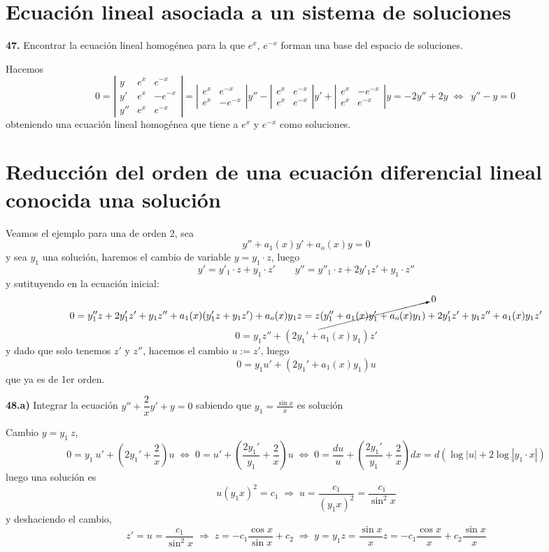\section{Ecuación lineal asociada a un sistema de soluciones}
\begin{ejer}
    \textbf{47.} Encontrar la ecuación lineal homogénea para la que $e^x$, $e^{-x}$ forman una base del espacio de soluciones.
\end{ejer}
\begin{sol}
    Hacemos
    $$0=\left|\begin{array}{ccc}
         y &  e^x & e^{-x}\\
         y' &  e^x & -e^{-x} \\
         y'' & e^x & e^{-x}
    \end{array}\right|=\left| \begin{array}{cc}
        e^x & e^{-x} \\
         e^x & -e^{-x} 
    \end{array}\right|y''-\left| \begin{array}{cc}
        e^x & e^{-x} \\
         e^x & e^{-x} 
    \end{array}\right|y'+\left| \begin{array}{cc}
        e^x & -e^{-x} \\
         e^x & e^{-x} 
    \end{array}\right|y=-2y''+2y \; \iff \; \boxed{\: y''-y=0 \:}$$
    obteniendo una ecuación lineal homogénea que tiene a $e^x$ y $e^{-x}$ como soluciones.
\end{sol}
\section{Reducción del orden de una ecuación diferencial lineal conocida una solución}
Veamos el ejemplo para una de orden 2, sea
$$y''+a_1(x)y'+a_o(x)y=0$$
y sea $y_1$ una solución, haremos el cambio de variable $y=y_1\cdot z$, luego 
$$y'=y'_1 \cdot z + y_1 \cdot z' \qquad y'' = y''_1 \cdot z + 2y'_1 z' + y_1 \cdot z'' $$
y sutituyendo en la ecuación inicial:
$$0=y''_1 z +2y'_1z'+y_1z''+a_1(x)(y'_1z+y_1z')+a_o(x) y_1 z=z\cancelto{0}{(y_1''+a_1(x)y'_1+a_o(x)y_1)}+2y'_1z'+y_1z''+a_1(x)y_1z'$$
$$0=y_1z''+(2y_1'+a_1(x)y_1)z'$$
y dado que solo tenemos $z'$ y $z''$, hacemos el cambio $u:=z'$, luego
$$0=y_1u'+(2y_1'+a_1(x)y_1)u$$
que ya es de 1er orden.
\begin{eje} \textbf{48.a)}
    Integrar la ecuación $y''+\dfrac{2}{x}y'+y=0$ sabiendo que $y_1=\frac{\sin x}{x}$ es solución
\end{eje}
\begin{sol}
    Cambio $y=y_1 \: z$,
    $$0=y_1 \: u'+\left(2y_1'+\dfrac{2}{x}\right)u \; \iff \; 0=u'+\left(\dfrac{2y_1'}{y_1}+\dfrac{2}{x}\right)u \; \iff \; 0=\dfrac{du}{u}+\left(\dfrac{2y_1'}{y_1}+\dfrac{2}{x}\right)dx=d\left(\log|u|+2 \log|y_1 \cdot x|\right)$$
    luego una solución es
    $$u(y_1 x)^2=c_1 \; \Rightarrow \; u=\dfrac{c_1}{(y_1 x)^2}=\dfrac{c_1}{\sin^2 x}$$
    y deshaciendo el cambio,
    $$z'=u=\dfrac{c_1}{\sin^2 x} \; \Rightarrow \; z=-c_1 \dfrac{\cos x }{\sin x}+c_2 \; \Rightarrow \; y=y_1 z =\dfrac{\sin x }{x} z =-c_1 \dfrac{\cos x }{x}+c_2 \dfrac{\sin x }{x}$$
\end{sol}
